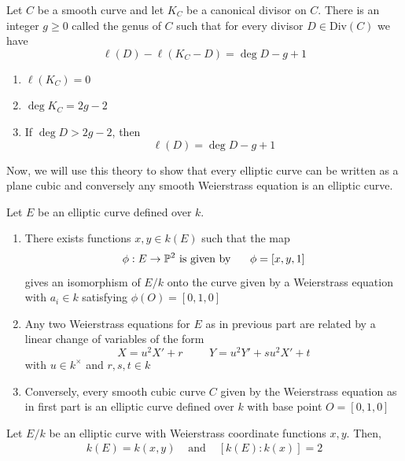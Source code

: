 \documentclass[oneside, 12pt]{scrbook}
\newcommand{\PP}{\mathbb{P}}
\theoremstyle{theorem}
\begin{document}
\begin{theorem}
Let $C$ be a smooth curve and let $K_{C}$ be a canonical divisor on $C$. There is an integer $g \geq 0$ called the genus of $C$ such that for every divisor $D \in \mathrm{Div}(C)$ we have 
\begin{equation*}
\ell(D) - \ell(K_{C} - D) = \deg D - g + 1
\end{equation*}
\end{theorem}

\begin{corollary}
\begin{enumerate}
\item $\ell(K_{C}) = 0$
\item $\deg K_{C} = 2g-2$
\item If $\deg D > 2g-2$, then $$\ell(D) = \deg D - g +1$$
\end{enumerate}
\end{corollary}

Now, we will use this theory to show that every elliptic curve can be written as a plane cubic and conversely any smooth Weierstrass equation is an elliptic curve. 

\begin{proposition}
Let $E$ be an elliptic curve defined over $k$. 
\begin{enumerate}
\item There exists functions $x,y \in k(E)$ such that the  map $$\phi: E \rightarrow \PP^2 \text{ is given by } \hspace{5mm} \phi = [x,y,1]$$
gives an isomorphism of $E/k$ onto the curve given by a Weierstrass equation with $a_{i} \in k$ satisfying $\phi(O) = [0,1,0]$
\item Any two Weierstrass equations for $E$ as in previous part are related by a linear change of variables of the form $$X = u^2 X' + r \hspace{ 1cm} Y = u^2 Y' + su^2 X' + t$$ with $u \in k^{\times}$ and $r,s,t \in k$
\item Conversely, every smooth cubic curve $C$ given by the Weierstrass equation as in first part is an elliptic curve defined over $k$ with base point $O = [0,1,0]$
\end{enumerate}
\end{proposition}

\begin{corollary}
Let $E/k$ be an elliptic curve with Weierstrass coordinate functions $x,y$. Then, 
\begin{align*}
k(E) = k(x,y) &\text{ and } & [k(E): k(x)] = 2
\end{align*}
\end{corollary}
\end{document}
